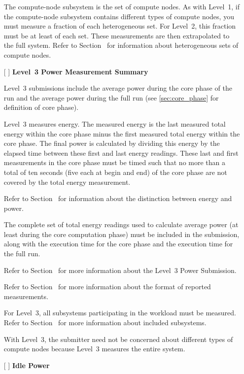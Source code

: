 \begin{itemize}
The compute-node subsystem is the set of compute nodes.
As with Level~1, if the compute-node subsystem contains different types of compute nodes, you must measure a fraction of each heterogeneous set.
For Level~2, this fraction must be at least \SpecFracMinLTwo{} of each set.
These measurements are then extrapolated to the full system.
Refer to Section~ for information about heterogeneous sets of compute nodes.

\newpage
\item[{[ ]}]
\textbf{Level~3 Power Measurement Summary}

Level~3 submissions include the average power during the core phase of the run and the average power during the full run (see \ref{sec:core_phase} for definition of core phase).

Level~3 measures energy.
The measured energy is the last measured total energy within the core phase minus the first measured total energy within the core phase.
The final power is calculated by dividing this energy by the elapsed time between these first and last energy readings.
These last and first measurements in the core phase must be timed such that no more than a total of ten seconds (five each at begin and end) of the core phase are not covered by the total energy measurement.

Refer to Section~ for information about the distinction between energy and power.

The complete set of total energy readings used to calculate average power (at least \MinMeasurementsCorePhaseLTwoThree{} during the core computation phase) must be included in the submission, along with the execution time for the core phase and the execution time for the full run.

Refer to Section~ for more information about the Level~3 Power Submission.

Refer to Section~ for more information about the format of reported measurements.

For Level~3, all subsystems participating in the workload must be measured.
Refer to Section~ for more information about included subsystems.

With Level~3, the submitter need not be concerned about different types of compute nodes because Level~3 measures the entire system.


\item[{[ ]}]
\textbf{Idle Power}


\end{itemize}
